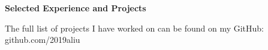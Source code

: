 \documentclass[letterpaper,10pt]{article}
\makeatletter
\newcommand{\resitem}[1]{\item #1 \vspace{-3.5pt}}
\newcommand{\resheading}[1]{{\large \colorbox{mygrey}{\begin{minipage}{\textwidth}{\textbf{#1 \vphantom{p\^{E}}}}\end{minipage}}}}
\newcommand{\ressubheading}[4]{
\begin{tabular*}{7.0in}{l@{\extracolsep{\fill}}r}
		\textbf{#1} & #2 \\
		\textit{#3} & \textit{#4} \\
\end{tabular*}\vspace{-6pt}}
\makeatother
\begin{document}
\resheading{Selected Experience and Projects}

\vspace{1em}
The full list of projects I have worked on can be found on my GitHub: github.com/2019aliu

\begin{itemize}


\end{itemize}
\end{document}
